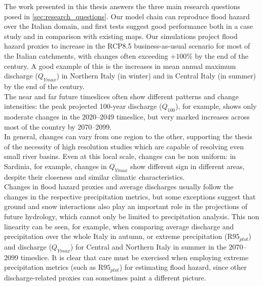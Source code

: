 The work presented in this thesis answers the three main research questions posed in \cref{sec:research_questions}.
Our model chain can reproduce flood hazard over the Italian domain, and first tests suggest good performance both in a case study and in comparison with existing maps.
Our simulations project flood hazard proxies to increase in the RCP8.5 business-as-usual scenario for most of the Italian catchments, with changes often exceeding $+100 \%$ by the end of the century.
A good example of this is the increases in mean annual maximum discharge ($Q_{Ymax}$) in Northern Italy (in winter) and in Central Italy (in summer) by the end of the century.\\
The near and far future timeslices often show different patterns and change intensities: the peak projected 100-year discharge ($Q_{100}$), for example, shows only moderate changes in the 2020--2049 timeslice, but very marked increases across most of the country by 2070--2099.\\
In general, changes can vary from one region to the other, supporting the thesis of the necessity of high resolution studies which are capable of resolving even small river basins.
Even at this local scale, changes can be non uniform: in Sardinia, for example, changes in $Q_{Ymax}$ show different sign in different areas, despite their closeness and similar climatic characteristics.\\
Changes in flood hazard proxies and average discharges usually follow the changes in the respective precipitation metrics, but some exceptions suggest that ground and snow interactions also play an important role in the projections of future hydrology, which cannot only be limited to precipitation analysis.
This non linearity can be seen, for example, when comparing average discharge and precipitation over the whole Italy in autumn, or extreme precipitation ($\textrm{R95}_{ptot}$) and discharge ($Q_{Ymax}$) for Central and Northern Italy in summer in the 2070--2099 timeslice.
It is clear that care must be exercised when employing extreme precipitation metrics (such as $\textrm{R95}_{ptot}$) for estimating flood hazard, since other discharge-related proxies can sometimes paint a different picture.

